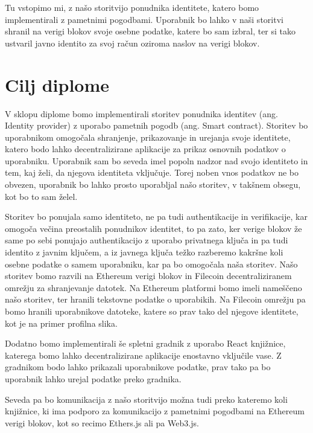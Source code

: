 \documentclass[a4paper,12pt,openright]{book}
\begin{document}
Tu vstopimo mi, z našo storitvijo ponudnika identitete, katero bomo implementirali z pametnimi pogodbami.
Uporabnik bo lahko v naši storitvi shranil na verigi blokov svoje osebne podatke, katere bo sam izbral, 
ter si tako ustvaril javno identito za svoj račun oziroma naslov na verigi blokov.

\section{Cilj diplome}
V sklopu diplome bomo implementirali storitev ponudnika identitev (ang. Identity provider) z uporabo pametnih pogodb (ang. Smart contract).
Storitev bo uporabnikom omogočala shranjenje, prikazovanje in urejanja svoje identitete, katero bodo lahko decentralizirane aplikacije za prikaz osnovnih podatkov o uporabniku.
Uporabnik sam bo seveda imel popoln nadzor nad svojo identiteto in tem, kaj želi, da njegova identiteta vključuje.
Torej noben vnos podatkov ne bo obvezen, uporabnik bo lahko prosto uporabljal našo storitev, v takšnem obsegu, kot bo to sam želel.

Storitev bo ponujala samo identiteto, ne pa tudi authentikacije in verifikacije, kar omogoča večina preostalih ponudnikov identitet, to pa zato, 
ker verige blokov že same po sebi ponujajo authentikacijo z uporabo privatnega ključa in pa tudi identito z javnim ključem, 
a iz javnega ključa težko razberemo kakršne koli osebne podatke o samem uporabniku, kar pa bo omogočala naša storitev.
Našo storitev bomo razvili na Ethereum verigi blokov in Filecoin decentraliziranem omrežju za shranjevanje datotek.
Na Ethereum platformi bomo imeli nameščeno našo storitev, ter hranili tekstovne podatke o uporabikih.
Na Filecoin omrežju pa bomo hranili uporabnikove datoteke, katere so prav tako del njegove identitete, kot je na primer profilna slika.

Dodatno bomo implementirali še spletni gradnik z uporabo React knjižnice, katerega bomo lahko decentralizirane aplikacije enostavno vključile vase.
Z gradnikom bodo lahko prikazali uporabnikove podatke, prav tako pa bo uporabnik lahko urejal podatke preko gradnika.

Seveda pa bo komunikacija z našo storitvijo možna tudi preko kateremo koli knjižnice, ki ima podporo za komunikacijo z pametnimi pogodbami na Ethereum verigi blokov, kot so recimo Ethers.js ali pa Web3.js.
\end{document}
